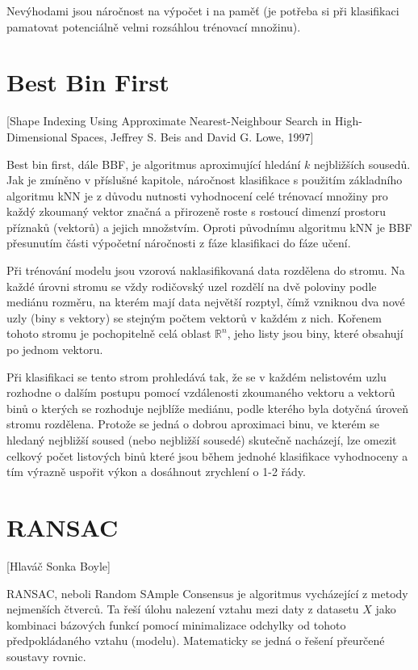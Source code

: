 	Nevýhodami jsou náročnost na výpočet i na paměť (je potřeba si při klasifikaci pamatovat potenciálně velmi rozsáhlou trénovací množinu).
	
\section{Best Bin First}

[Shape Indexing Using Approximate Nearest-Neighbour Search in
High-Dimensional Spaces, Jeffrey S. Beis and David G. Lowe, 1997]

	Best bin first, dále BBF, je algoritmus aproximující hledání $k$ nejbližších sousedů. Jak je zmíněno v příslušné kapitole, náročnost klasifikace s použitím základního algoritmu kNN je z důvodu nutnosti vyhodnocení celé trénovací množiny pro každý zkoumaný vektor značná a přirozeně roste s rostoucí dimenzí prostoru příznaků (vektorů) a jejich množstvím. Oproti původnímu algoritmu kNN je BBF přesunutím části výpočetní náročnosti z fáze klasifikaci do fáze učení.
	
	Při trénování modelu jsou vzorová naklasifikovaná data rozdělena do stromu. Na každé úrovni stromu se vždy rodičovský uzel rozdělí na dvě poloviny podle mediánu rozměru, na kterém mají data největší rozptyl, čímž vzniknou dva nové uzly (biny s vektory) se stejným počtem vektorů v každém z nich. Kořenem tohoto stromu je pochopitelně celá oblast $\mathbb{R}^n$, jeho listy jsou biny, které obsahují po jednom vektoru.
	
	Při klasifikaci se tento strom prohledává tak, že se v každém nelistovém uzlu rozhodne o dalším postupu pomocí vzdálenosti zkoumaného vektoru a vektorů binů o kterých se rozhoduje nejblíže mediánu, podle kterého byla dotyčná úroveň stromu rozdělena. Protože se jedná o dobrou aproximaci binu, ve kterém se hledaný nejbližší soused (nebo nejbližší sousedé) skutečně nacházejí, lze omezit celkový počet listových binů které jsou během jednohé klasifikace vyhodnoceny a tím výrazně uspořit výkon a dosáhnout zrychlení o 1-2 řády.
	
	

\section{RANSAC}

	[Hlaváč Sonka Boyle]

	RANSAC, neboli Random SAmple Consensus je algoritmus vycházející z metody nejmenších čtverců. Ta řeší úlohu nalezení vztahu mezi daty z datasetu $X$ jako kombinaci bázových funkcí pomocí minimalizace odchylky od tohoto předpokládaného vztahu (modelu). Matematicky se jedná o řešení přeurčené soustavy rovnic.
	

